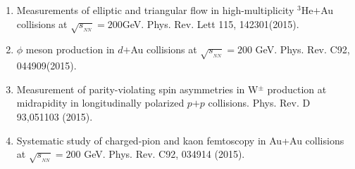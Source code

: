 \documentclass[11pt]{article}
\begin{document}
\begin{flushleft}
\begin{center}
\begin{enumerate}
	\item Measurements of elliptic and triangular flow in high-multiplicity $^{3}$He$+$Au collisions at $\sqrt{s_{_{NN}}}=200$GeV. Phys. Rev. Lett 115, 142301(2015).
	\item $\phi$ meson production in $d$$+$Au collisions at $\sqrt{s_{_{NN}}}=200$ GeV. Phys. Rev. C92, 044909(2015).	
	\item Measurement of parity-violating spin asymmetries in W$^\pm$ production at midrapidity in longitudinally polarized $p$$+$$p$ collisions. Phys. Rev. D 93,051103 (2015).
	\item Systematic study of charged-pion and kaon femtoscopy in Au+Au collisions at $\sqrt{s_{_{NN}}}=200$ GeV. Phys. Rev. C92, 034914 (2015).
\end{enumerate}

\end{center}



\end{flushleft}










\vspace{7pt}


































\end{document}
